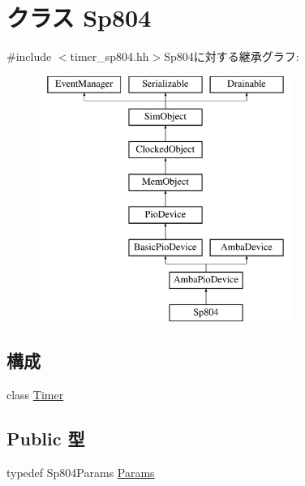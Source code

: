 \hypertarget{classSp804}{
\section{クラス Sp804}
\label{classSp804}
}


{\ttfamily \#include $<$timer\_\-sp804.hh$>$}Sp804に対する継承グラフ:\begin{figure}[H]
\begin{center}
\leavevmode
\includegraphics[height=8cm]{classSp804}
\end{center}
\end{figure}
\subsection*{構成}
\begin{DoxyCompactItemize}
\item 
class \hyperlink{classSp804_1_1Timer}{Timer}
\end{DoxyCompactItemize}
\subsection*{Public 型}
\begin{DoxyCompactItemize}
\item 
typedef Sp804Params \hyperlink{classSp804_af822827c8c9baefc6aafbdc713bc2b8d}{Params}
\end{DoxyCompactItemize}
